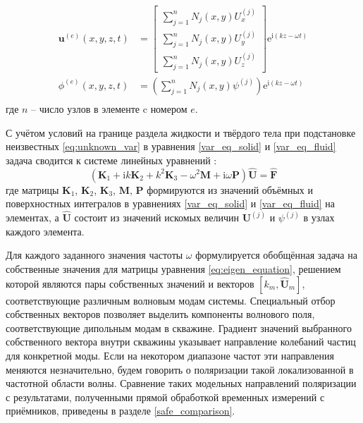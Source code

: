 \documentclass[a4paper,11pt]{article}
\newcommand{\ii}{\mathrm{i}}
\begin{document}
\begin{equation}
\begin{split}
\mathbf{u}^{(e)}(x,y,z,t) &= \left[
\begin{array}{c}
\sum_{j=1}^{n}N_j(x,y)U_{x}^{(j)} \\
\sum_{j=1}^{n}N_j(x,y)U_{y}^{(j)} \\
\sum_{j=1}^{n}N_j(x,y)U_{z}^{(j)} 
\end{array}
\right] \mathrm{e}^{\ii (kz-\omega t)} %
\\
\phi^{(e)}(x,y,z,t) &= \left(\sum_{j=1}^{n}N_j(x,y)\psi^{(j)} \right) \mathrm{e}^{\ii (kz-\omega t)} %
\\
\end{split} \label{eq:unknown_var}
\end{equation}
где $n$ -- число узлов в элементе c номером $e$.  

С учётом условий на границе раздела жидкости и твёрдого тела при подстановке неизвестных \eqref{eq:unknown_var} в уравнения \eqref{var_eq_solid} и \eqref{var_eq_fluid} задача сводится к системе линейных уравнений \cite{Bartoli2006,Treyssede2013}:
\begin{equation}
(\mathbf{K}_1 + \ii k \mathbf{K}_2 + k^2 \mathbf{K}_3 - \omega^2 \mathbf{M} + \ii \omega \mathbf{P}) \hat{\mathbf{U}} = \hat{\mathbf{F}} \label{eq:eigen_equation}
\end{equation}
где матрицы $\mathbf{K}_1$, $\mathbf{K}_2$, $\mathbf{K}_3$, $\mathbf{M}$, $\mathbf{P}$ формируются из значений объёмных и поверхностных интегралов в уравнениях \eqref{var_eq_solid} и \eqref{var_eq_fluid} на элементах, а $ \hat{\mathbf{U}}$ состоит из значений искомых величин $\mathbf{U}^{(j)}$ и $\psi^{(j)}$ в узлах каждого элемента. 

Для каждого заданного значения частоты $\omega$ формулируется обобщённая задача на собственные значения для матрицы уравнения \eqref{eq:eigen_equation}, решением которой являются пары собственных значений и векторов $[k_m, \hat{\mathbf{U}}_m]$, соответствующие различным волновым модам системы. Специальный отбор собственных векторов позволяет выделить компоненты волнового поля, соответствующие дипольным модам в скважине. Градиент значений выбранного собственного вектора внутри скважины указывает направление колебаний частиц для конкретной моды. Если на некотором диапазоне частот эти направления меняются незначительно, будем говорить о поляризации такой локализованной в частотной области волны. Сравнение таких модельных направлений поляризации с результатами, полученными прямой обработкой временных измерений с приёмников, приведены в разделе \ref{safe_comparison}.
\end{document}
